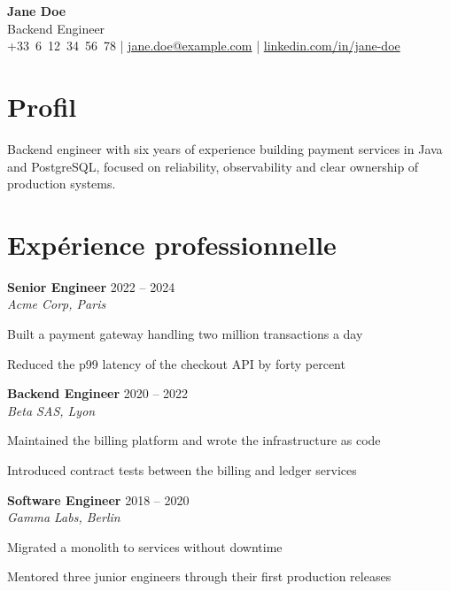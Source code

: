 \documentclass[10pt]{extarticle}
\newcommand{\role}[3]{%
  \textbf{#1} \hfill {\color{soft}\small #3}\\[-1pt]
  {\itshape\small #2}\par
}
\begin{document}
\begin{center}
    {\fontsize{18}{18}\selectfont\bfseries\color{accent} Jane Doe}\\[3pt]
    {\normalsize\color{soft} Backend Engineer}\\[4pt]
    {\footnotesize
      +33~6~12~34~56~78 \quad|\quad
      \href{mailto:jane.doe@example.com}{jane.doe@example.com} \quad|\quad
      \href{https://www.linkedin.com/in/jane-doe}{linkedin.com/in/jane-doe}
    }
\end{center}
\vspace{-9pt}

\section{Profil}

Backend engineer with six years of experience building payment services in Java and PostgreSQL, focused on reliability, observability and clear ownership of production systems.

\section{Expérience professionnelle}

\role{Senior Engineer}{Acme Corp, Paris}{2022 – 2024}

\begin{tightlist}
    \item Built a payment gateway handling two million transactions a day

    \item Reduced the p99 latency of the checkout API by forty percent

\end{tightlist}

\role{Backend Engineer}{Beta SAS, Lyon}{2020 – 2022}

\begin{tightlist}
    \item Maintained the billing platform and wrote the infrastructure as code

    \item Introduced contract tests between the billing and ledger services

\end{tightlist}

\role{Software Engineer}{Gamma Labs, Berlin}{2018 – 2020}

\begin{tightlist}
    \item Migrated a monolith to services without downtime

    \item Mentored three junior engineers through their first production releases

\end{tightlist}
\end{document}
